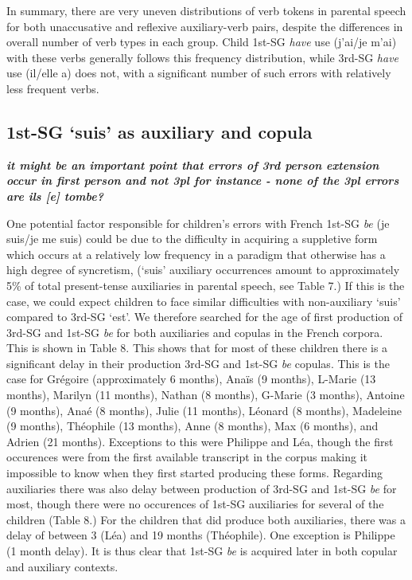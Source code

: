 \documentclass[
  12pt,
]{article}
\begin{document}
\begin{enumerate}[resume*]
\begin{enumerate}[resume*]
\begin{enumerate}[resume*]
\begin{enumerate}[resume*]
\begin{enumerate}[resume*]
In summary, there are very uneven distributions of verb tokens in parental speech for both unaccusative and reflexive auxiliary-verb pairs, despite the differences in overall number of verb types in each group. Child 1st-SG \emph{have} use (j'ai/je m'ai) with these verbs generally follows this frequency distribution, while 3rd-SG \emph{have} use (il/elle a) does not, with a significant number of such errors with relatively less frequent verbs.

\hypertarget{st-sg-suis-as-auxiliary-and-copula}{%
\subsection{1st-SG `suis' as auxiliary and copula}\label{st-sg-suis-as-auxiliary-and-copula}}

\textbf{\emph{it might be an important point that errors of 3rd person extension occur in first person and not 3pl for instance - none of the 3pl errors are ils {[}e{]} tombe?}}

One potential factor responsible for children's errors with French 1st-SG \emph{be} (je suis/je me suis) could be due to the difficulty in acquiring a suppletive form which occurs at a relatively low frequency in a paradigm that otherwise has a high degree of syncretism, (`suis' auxiliary occurrences amount to approximately 5\% of total present-tense auxiliaries in parental speech, see Table 7.) If this is the case, we could expect children to face similar difficulties with non-auxiliary `suis' compared to 3rd-SG `est'. We therefore searched for the age of first production of 3rd-SG and 1st-SG \emph{be} for both auxiliaries and copulas in the French corpora. This is shown in Table 8. This shows that for most of these children there is a significant delay in their production 3rd-SG and 1st-SG \emph{be} copulas. This is the case for Grégoire (approximately 6 months), Anaïs (9 months), L-Marie (13 months), Marilyn (11 months), Nathan (8 months), G-Marie (3 months), Antoine (9 months), Anaé (8 months), Julie (11 months), Léonard (8 months), Madeleine (9 months), Théophile (13 months), Anne (8 months), Max (6 months), and Adrien (21 months). Exceptions to this were Philippe and Léa, though the first occurences were from the first available transcript in the corpus making it impossible to know when they first started producing these forms. Regarding auxiliaries there was also delay between production of 3rd-SG and 1st-SG \emph{be} for most, though there were no occurences of 1st-SG auxiliaries for several of the children (Table 8.) For the children that did produce both auxiliaries, there was a delay of between 3 (Léa) and 19 months (Théophile). One exception is Philippe (1 month delay). It is thus clear that 1st-SG \emph{be} is acquired later in both copular and auxiliary contexts.


\end{enumerate}
\end{enumerate}
\end{enumerate}
\end{enumerate}
\end{enumerate}
\end{document}
